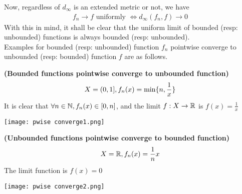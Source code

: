 \documentclass{report}
\begin{document}
\begin{mdframed}
Now, regardless of $d_{\infty}$ is an extended metric or not, we have 
\begin{align*}
f_n\to f\text{ uniformly }\iff d_{\infty}(f_n,f)\to 0
\end{align*}
With this in mind, it shall be clear that the uniform limit of bounded (resp: unbounded) functions is always bounded (resp: unbounded).\\ 

Examples for bounded (resp: unbounded) function $f_n$ pointwise converge to unbounded (resp: bounded) function $f$ are as follows.

\begin{Example}{\textbf{(Bounded functions pointwise converge to unbounded function)}}{}
\label{bfpce}
\begin{align*}
  X=(0,1],f_n(x)=\min  \{ n,\frac{1}{x} \}
\end{align*}
It is clear that $\forall n\in\mathbb{N},f_n(x) \in [0,n]$, and the limit $f:X\rightarrow \mathbb{R}$ is $f(x)=\frac{1}{x}$
\begin{center}
   \begin{minipage}{0.9\linewidth}  
       \centering
\texttt{[image: pwise converge1.png]}
   \end{minipage}
\end{center}
\end{Example}
\begin{Example}{\textbf{(Unbounded functions pointwise converge to bounded function)}}{}
\begin{align*}
X=\mathbb{R},f_n(x)=\frac{1}{n}x
\end{align*}
The limit function is $f(x)=0$
\begin{center}
   \begin{minipage}{0.9\linewidth}  
       \centering  \texttt{[image: pwise converge2.png]}
   \end{minipage}
\end{center}
\end{Example}
\end{mdframed} 
\end{document}
